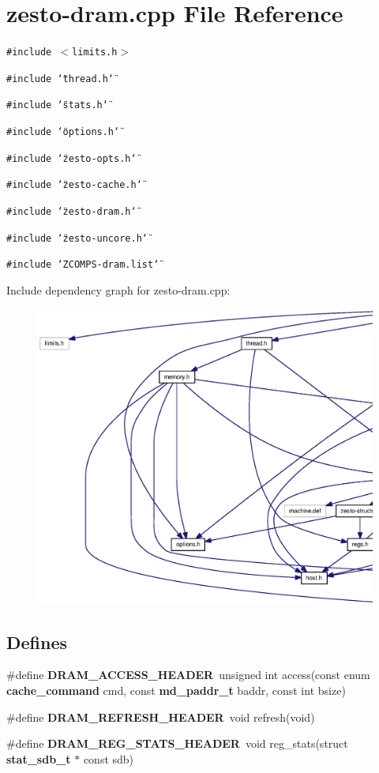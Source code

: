 \section{zesto-dram.cpp File Reference}
\label{zesto-dram_8cpp}
{\tt \#include $<$limits.h$>$}\par
{\tt \#include \char`\"{}thread.h\char`\"{}}\par
{\tt \#include \char`\"{}stats.h\char`\"{}}\par
{\tt \#include \char`\"{}options.h\char`\"{}}\par
{\tt \#include \char`\"{}zesto-opts.h\char`\"{}}\par
{\tt \#include \char`\"{}zesto-cache.h\char`\"{}}\par
{\tt \#include \char`\"{}zesto-dram.h\char`\"{}}\par
{\tt \#include \char`\"{}zesto-uncore.h\char`\"{}}\par
{\tt \#include \char`\"{}ZCOMPS-dram.list\char`\"{}}\par


Include dependency graph for zesto-dram.cpp:\nopagebreak
\begin{figure}[H]
\begin{center}
\leavevmode
\includegraphics[width=420pt]{zesto-dram_8cpp__incl}
\end{center}
\end{figure}
\subsection*{Defines}
\begin{CompactItemize}
\item 
\#define {\bf DRAM\_\-ACCESS\_\-HEADER}~unsigned int access(const enum {\bf cache\_\-command} cmd, const {\bf md\_\-paddr\_\-t} baddr, const int bsize)
\item 
\#define {\bf DRAM\_\-REFRESH\_\-HEADER}~void refresh(void)
\item 
\#define {\bf DRAM\_\-REG\_\-STATS\_\-HEADER}~void reg\_\-stats(struct {\bf stat\_\-sdb\_\-t} $\ast$ const sdb)
\end{CompactItemize}
